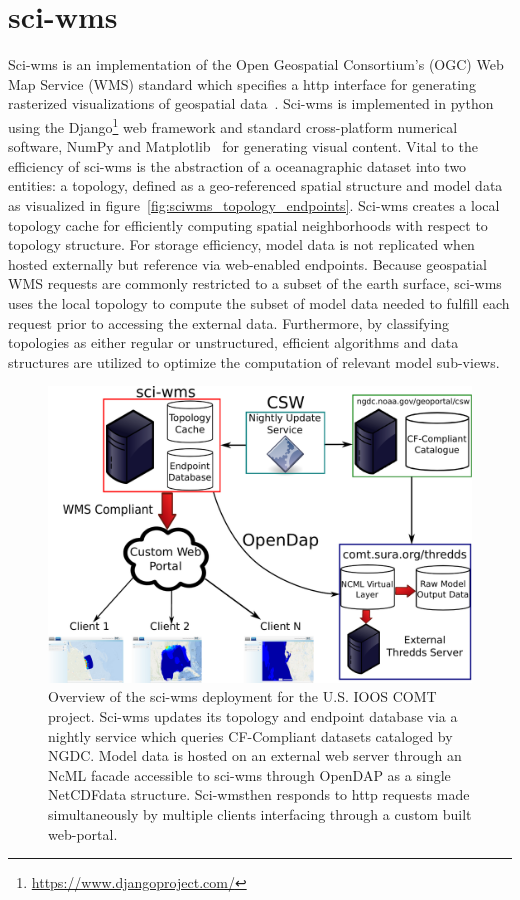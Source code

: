 \documentclass[11pt,twocolumn,twoside]{IEEEtran}
\newcommand{\comt}{COMT}
\newcommand{\ioos}{IOOS}
\newcommand{\ogc}{OGC}
\newcommand{\wms}{WMS}
\newcommand{\ncml}{NcML}
\newcommand{\ngdc}{NGDC}
\newcommand{\opendap}{OpenDAP}
\newcommand{\netcdf}{NetCDF}
\newcommand{\sciwms}{sci-wms}
\newcommand{\Sciwms}{Sci-wms}
\begin{document}
\section{\sciwms{}}
\Sciwms{} is an implementation of the Open Geospatial Consortium's
(\ogc{}) Web Map Service (\wms{}) standard which specifies a http
interface for generating rasterized visualizations of geospatial
data~\cite{wms14}. Sci-wms is implemented in python using the
Django\footnote{\url{https://www.djangoproject.com/}} web framework
and standard cross-platform numerical software, NumPy and
Matplotlib~\cite{numpy11, hunter07} for generating visual
content. Vital to the efficiency of \sciwms{} is the
abstraction of a oceanagraphic dataset into two entities: a topology,
defined as a geo-referenced spatial structure and model data as
visualized in figure~\ref{fig:sciwms_topology_endpoints}. \Sciwms{}
creates a local topology cache for efficiently computing spatial
neighborhoods with respect to topology structure.  For storage
efficiency, model data is not replicated when hosted externally but
reference via web-enabled endpoints. Because
geospatial \wms{} requests are commonly restricted to a subset of the
earth surface, \sciwms{} uses the local topology to compute the
subset of model data needed to fulfill each request prior to
accessing the external data. Furthermore, by classifying
topologies as either regular or unstructured, efficient algorithms and
data structures are utilized to optimize the computation of relevant
model sub-views.

\begin{figure}
  \centering
  \includegraphics[width=\columnwidth]{./figs/overview.pdf}
  \caption{Overview of the \sciwms{} deployment for the U.S. \ioos{}
    \comt{} project. \Sciwms{} updates its topology and endpoint
    database via a nightly service which queries CF-Compliant datasets
    cataloged by \ngdc{}. Model data is hosted on an external web
    server through an \ncml{} facade accessible to \sciwms{} through
    \opendap{} as a single \netcdf data structure. \Sciwms then
    responds to http requests made simultaneously by multiple clients
    interfacing through a custom built web-portal.}
  \label{fig:overview1}
\end{figure}
\end{document}

